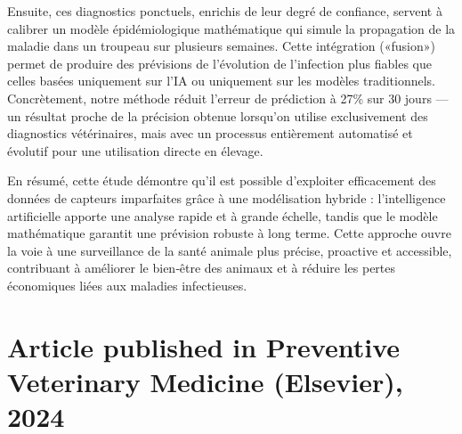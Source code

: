 Ensuite, ces diagnostics ponctuels, enrichis de leur degré de confiance, servent à calibrer un modèle épidémiologique mathématique qui simule la propagation de la maladie dans un troupeau sur plusieurs semaines. Cette intégration («fusion») permet de produire des prévisions de l’évolution de l’infection plus fiables que celles basées uniquement sur l’IA ou uniquement sur les modèles traditionnels. Concrètement, notre méthode réduit l’erreur de prédiction à 27\% sur 30 jours — un résultat proche de la précision obtenue lorsqu’on utilise exclusivement des diagnostics vétérinaires, mais avec un processus entièrement automatisé et évolutif pour une utilisation directe en élevage.

En résumé, cette étude démontre qu’il est possible d’exploiter efficacement des données de capteurs imparfaites grâce à une modélisation hybride : l’intelligence artificielle apporte une analyse rapide et à grande échelle, tandis que le modèle mathématique garantit une prévision robuste à long terme. Cette approche ouvre la voie à une surveillance de la santé animale plus précise, proactive et accessible, contribuant à améliorer le bien‑être des animaux et à réduire les pertes économiques liées aux maladies infectieuses.


\section{Article published in Preventive Veterinary Medicine (Elsevier), 2024}



